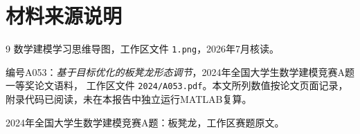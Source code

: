 \documentclass[UTF8,zihao=-4]{ctexart}
\begin{document}
\section*{材料来源说明}

\begin{thebibliography}{9}
数学建模学习思维导图，工作区文件 \texttt{1.png}，2026年7月核读。

编号A053：\emph{基于目标优化的板凳龙形态调节}，2024年全国大学生数学建模竞赛A题一等奖论文语料，
工作区文件 \texttt{2024/A053.pdf}。本文所列数值按论文页面记录，附录代码已阅读，未在本报告中独立运行MATLAB复算。

2024年全国大学生数学建模竞赛A题：板凳龙，工作区赛题原文。
\end{thebibliography}
\end{document}
